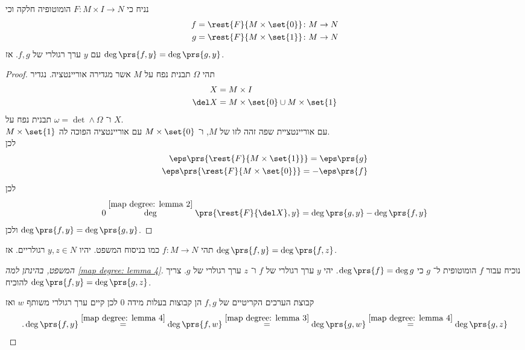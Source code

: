 \documentclass[a4paper,10pt,twoside,openany]{book}
\begin{document}
\begin{lemma}\label{map degree: lemma 3}
נניח כי
$F \colon M \times I \to N$
הומוטופיה חלקה וכי
\begin{align*}
f &= \rest{F}{M \times \set{0}} \colon M \to N \\
g &= \rest{F}{M \times \set{1}} \colon M \to N
\end{align*}
עם
$y$
ערך רגולרי של
$f,g$.
אז
$\deg\prs{f,y} = \deg\prs{g,y}$.
\end{lemma}
\begin{proof}
תהי
$\Omega$
תבנית נפח על
$M$
אשר מגדירה אוריינטציה.
נגדיר
\begin{align*}
X &= M \times I \\
\del X &= M \times \set{0} \cup M \times \set{1}
\end{align*}
ו־%
$\omega = \det \wedge \Omega$
תבנית נפח על
$X$.\\
$M \times \set{1}$
עם אוריינטציית שפה זהה לזו של
$M$,
ו־%
$M \times \set{0}$
עם אוריינטציה הפוכה לה.
\\
לכן
\begin{align*}
\eps\prs{\rest{F}{M \times \set{1}}} = \eps\prs{g} \\
\eps\prs{\rest{F}{M \times \set{0}}} =- \eps\prs{f}
\end{align*}
לכן
\begin{align*}
0 \stackrel{\ref{map degree: lemma 2}} \deg\prs{\rest{F}{\del X}, y} = \deg\prs{g,y} - \deg\prs{f,y}
\end{align*}
ולכן
$\deg\prs{f,y} = \deg\prs{g,y}$.
\end{proof}

\begin{lemma}\label{map degree: lemma 4}
תהי
$f \colon M \to N$
כמו בניסוח המשפט.
יהיו
$y,z \in N$
רגולריים.
אז
$\deg \prs{f,y} = \deg\prs{f,z}$.
\end{lemma}

\begin{proof}[המשפט, בהינתן למה
\ref{map degree: lemma 4}]
נוכיח עבור
$f$
הומוטופית ל־%
$g$
כי
$\deg\prs{f} = \deg{g}$.
יהי
$y$
ערך רגולרי של
$f$
ו־%
$z$
ערך רגולרי של
$g$.
צריך להוכיח
$\deg\prs{f,y} = \deg\prs{g,z}$.

קבוצת הערכים הקריטיים של
$f,g$
הן קבוצות בעלות מידה
$0$
לכן קיים ערך רגולרי משותף
$w$
ואז
\[\text{.} \deg\prs{f,y} \stackrel{\ref{map degree: lemma 4}}{=} \deg\prs{f,w} \stackrel{\ref{map degree: lemma 3}}{=} \deg\prs{g,w} \stackrel{\ref{map degree: lemma 4}}{=} \deg\prs{g,z}\]
\end{proof}
\end{document}
